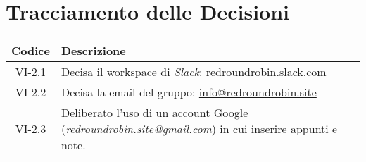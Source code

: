 \section*{Tracciamento delle Decisioni}

\begin{center}
	\begin{longtable}{|c|p{14.5cm}|}
	\hline
	\rowcolor{lighter-grayer}
	\textbf{Codice} & \textbf{Descrizione} \\
	\hline
	\endfirsthead

	\hline
	VI-2.1 & Decisa il workspace di \textit{Slack}: \href{http://redroundrobin.slack.com}{redroundrobin.slack.com} \\
	\hline
	VI-2.2 & Decisa la email del gruppo: \href{mailto:info@redroundrobin.site}{info@redroundrobin.site} \\
	\hline
	VI-2.3 & Deliberato l'uso di un account Google (\textit{redroundrobin.site@gmail.com}) in cui inserire appunti e note. \\
	\hline

	\end{longtable}
\end{center}